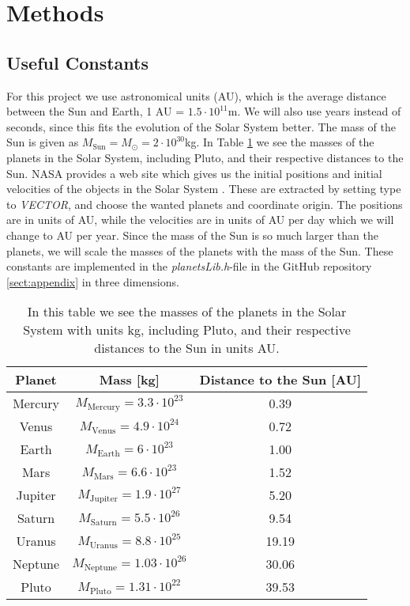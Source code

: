\documentclass[12pt,a4paper,english]{article}
\begin{document}
\section{Methods}
\label{sect:Method}
\subsection{Useful Constants}
\label{subsect:constants}
For this project we use astronomical units (AU), which is the average distance between the Sun and Earth, 1 AU = $1.5\cdot10^{11}$m. We will also use years instead of seconds, since this fits the evolution of the Solar System better. The mass of the Sun is given as $M_{\text{Sun}}=M_{\odot}=2\cdot10^{30}$kg. In Table \ref{tab:planets} we see the masses of the planets in the Solar System, including Pluto, and their respective distances to the Sun. NASA provides a web site which gives us the initial positions and initial velocities of the objects in the Solar System \cite{horizon}. These are extracted by setting type to \textit{VECTOR}, and choose the wanted planets and coordinate origin. The positions are in units of AU, while the velocities are in units of AU per day which we will change to AU per year. Since the mass of the Sun is so much larger than the planets, we will scale the masses of the planets with the mass of the Sun. These constants are implemented in the \textit{planetsLib.h}-file in the GitHub repository \ref{sect:appendix} in three dimensions.

\begin{table}[htbp]
	\centering
	\begin{tabular}{ |c|c|c| }
		\hline \rule{0pt}{13pt}
		Planet & Mass [kg] & Distance to the Sun [AU] \\
		\hline \rule{0pt}{13pt}
		Mercury & $M_{\text{Mercury}}=3.3\cdot10^{23}$ & 0.39  \\
		\hline \rule{0pt}{13pt}
		Venus & $M_{\text{Venus}}=4.9\cdot10^{24}$ & 0.72 \\
		\hline \rule{0pt}{13pt}
		Earth & $M_{\text{Earth}}=6\cdot10^{23}$ & 1.00 \\
		\hline \rule{0pt}{13pt}
		Mars & $M_{\text{Mars}}=6.6\cdot10^{23}$ & 1.52 \\
		\hline \rule{0pt}{13pt}
		Jupiter & $M_{\text{Jupiter}}=1.9\cdot10^{27}$ & 5.20 \\
		\hline \rule{0pt}{13pt}
		Saturn & $M_{\text{Saturn}}=5.5\cdot10^{26}$ & 9.54 \\
		\hline \rule{0pt}{13pt}
		Uranus & $M_{\text{Uranus}}=8.8\cdot10^{25}$ & 19.19 \\
		\hline \rule{0pt}{13pt}
		Neptune & $M_{\text{Neptune}}=1.03\cdot10^{26}$ & 30.06 \\
		\hline \rule{0pt}{13pt}
		Pluto & $M_{\text{Pluto}}=1.31\cdot10^{22}$ & 39.53 \\
		\hline 
	\end{tabular}	
	\caption{In this table we see the masses of the planets in the Solar System with units kg, including Pluto, and their respective distances to the Sun in units AU.}
	\label{tab:planets}
\end{table}
\end{document}
